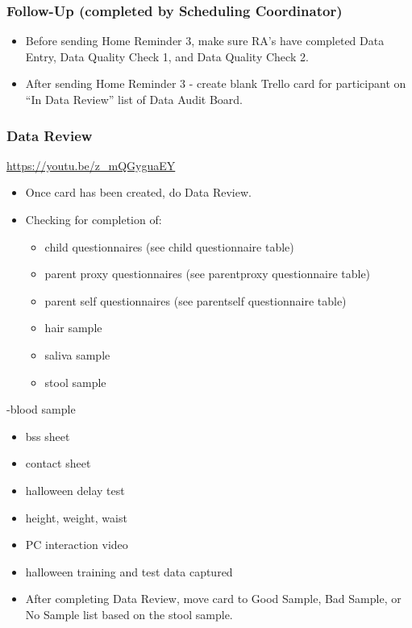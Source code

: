 \documentclass[]{book}
\begin{document}
\hypertarget{follow-up-completed-by-scheduling-coordinator-2}{%
\subsubsection{Follow-Up (completed by Scheduling Coordinator)}\label{follow-up-completed-by-scheduling-coordinator-2}}

\begin{itemize}
\item
  Before sending Home Reminder 3, make sure RA's have completed Data Entry, Data Quality Check 1, and Data Quality Check 2.
\item
  After sending Home Reminder 3 - create blank Trello card for participant on ``In Data Review'' list of Data Audit Board.
\end{itemize}

\hypertarget{data-review-1}{%
\subsubsection{Data Review}\label{data-review-1}}

\url{https://youtu.be/z_mQGyguaEY}

\begin{itemize}
\item
  Once card has been created, do Data Review.
\item
  Checking for completion of:

  \begin{itemize}
  \item
    child questionnaires (see child questionnaire table)
  \item
    parent proxy questionnaires (see parentproxy questionnaire table)
  \item
    parent self questionnaires (see parentself questionnaire table)
  \item
    hair sample
  \item
    saliva sample
  \item
    stool sample
  \end{itemize}
\end{itemize}

-blood sample

\begin{itemize}
\item
  bss sheet
\item
  contact sheet
\item
  halloween delay test
\item
  height, weight, waist
\item
  PC interaction video
\item
  halloween training and test data captured
\item
  After completing Data Review, move card to Good Sample, Bad Sample, or No Sample list based on the stool sample.
\end{itemize}
\end{document}
